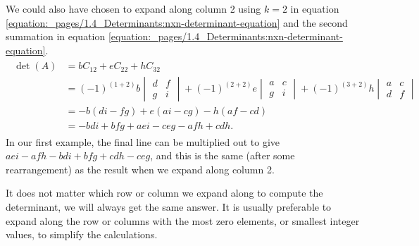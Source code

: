 \documentclass[letterpaper,10pt,english]{jupyterBook}
\begin{document}
\sphinxAtStartPar
We could also have chosen to expand along column 2 using \(k = 2\) in equation \eqref{equation:_pages/1.4_Determinants:nxn-determinant-equation} and the second summation in equation \eqref{equation:_pages/1.4_Determinants:nxn-determinant-equation}.
\begin{equation*}
\begin{split} \begin{align*}
    \det(A) &= b C_{12} + e C_{22} + h C_{32} \\
    &= (-1)^{(1+2)} b\begin{vmatrix} d & f \\ g & i \end{vmatrix}
    + (-1)^{(2+2)}e \begin{vmatrix} a & c \\ g & i \end{vmatrix}
    + (-1)^{(3+2)}h \begin{vmatrix} a & c \\ d & f \end{vmatrix} \\
    &= -b(di-fg) + e(ai-cg) - h(af-cd) \\
    &= -bdi + bfg + aei - ceg - afh + cdh.
\end{align*} \end{split}
\end{equation*}
\sphinxAtStartPar
In our first example, the final line can be multiplied out to give \(aei - afh - bdi + bfg + cdh - ceg\), and this is the same (after some rearrangement) as the result when we expand along column 2.

\sphinxAtStartPar
It does not matter which row or column we expand along to compute the determinant, we will always get the same answer. It is usually preferable to expand along the row or columns with the most zero elements, or smallest integer values, to simplify the calculations.
\end{document}
